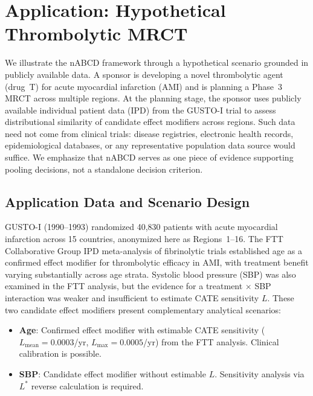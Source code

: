 \section{Application: Hypothetical Thrombolytic MRCT}\label{sec:application}

We illustrate the nABCD framework through a hypothetical scenario grounded in publicly available data. A sponsor is developing a novel thrombolytic agent (drug~T) for acute myocardial infarction (AMI) and is planning a Phase~3 MRCT across multiple regions. At the planning stage, the sponsor uses publicly available individual patient data (IPD) from the GUSTO-I trial\cite{gusto1993} to assess distributional similarity of candidate effect modifiers across regions. Such data need not come from clinical trials: disease registries, electronic health records, epidemiological databases, or any representative population data source would suffice. We emphasize that nABCD serves as one piece of evidence supporting pooling decisions, not a standalone decision criterion.

\subsection{Application Data and Scenario Design}\label{sec:app_scenario}

GUSTO-I (1990--1993) randomized 40,830 patients with acute myocardial infarction across 15 countries, anonymized here as Regions~1--16.\cite{gusto1993} The FTT Collaborative Group\cite{ftt1994} IPD meta-analysis of fibrinolytic trials established age as a confirmed effect modifier for thrombolytic efficacy in AMI, with treatment benefit varying substantially across age strata. Systolic blood pressure (SBP) was also examined in the FTT analysis, but the evidence for a treatment $\times$ SBP interaction was weaker and insufficient to estimate CATE sensitivity $L$. These two candidate effect modifiers present complementary analytical scenarios:

\begin{itemize}
  \item \textbf{Age}: Confirmed effect modifier with estimable CATE sensitivity ($L_{\text{mean}} = 0.0003$/yr, $L_{\max} = 0.0005$/yr) from the FTT analysis.\cite{ftt1994} Clinical calibration is possible.
  \item \textbf{SBP}: Candidate effect modifier without estimable $L$. Sensitivity analysis via $L^*$ reverse calculation is required.
\end{itemize}


